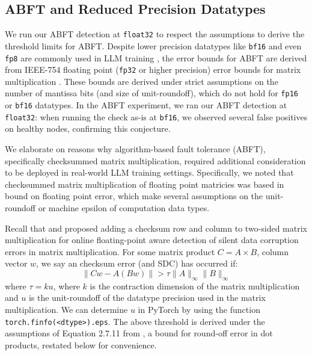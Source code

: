 \subsection{ABFT and Reduced Precision Datatypes} \label{appendix:abft_bf16}

We run our ABFT detection at \verb|float32| to respect the assumptions to derive the threshold limits for ABFT. Despite lower precision datatypes like \verb|bf16| and even \verb|fp8| are commonly used in LLM training \cite{lee2024fp8againquantifyingeffects}, the error bounds for ABFT are derived from IEEE-754 floating point (\verb|fp32| or higher precision) error bounds for matrix multiplication \cite{matrixcopmutations2013}. These bounds are derived under strict assumptions on the number of mantissa bits (and size of unit-roundoff), which do not hold for \verb|fp16| or \verb|bf16| datatypes. In the ABFT experiment, we ran our ABFT detection at \verb|float32|: when running the check as-is at \verb|bf16|, we observed several false positives on healthy nodes, confirming this conjecture. 

We elaborate on reasons why algorithm-based fault tolerance (ABFT), specifically checksummed matrix multiplication, required additional consideration to be deployed in real-world LLM training settings. Specifically, we noted that checksummed matrix multiplication of floating point matricies was based in bound on floating point error, which make several assumptions on the unit-roundoff or machine epsilon of computation data types.

Recall that \citet{panruowu_online_soft_error_correction} and \citet{utexas_abft} proposed adding a checksum row and column to two-sided matrix multiplication for online floating-point aware detection of silent data corruption errors in matrix multiplication. For some matrix product $C = A \times B$, column vector $w$, we say an checksum error (and SDC) has occurred if:
\begin{equation} \label{equation:abft_condition2}
    \| C w - A( Bw) \| > \tau  \| A \|_\infty \| B \|_\infty
\end{equation}
where $\tau = ku$, where $k$ is the contraction dimension of the matrix multiplication and $u$ is the unit-roundoff of the datatype precision used in the matrix multiplication. We can determine $u$ in PyTorch by using the function \verb|torch.finfo(<dtype>).eps|. The above threshold is derived under the assumptions of Equation 2.7.11 from \citet{matrixcopmutations2013}, a bound for round-off error in dot products, restated below for convenience.

